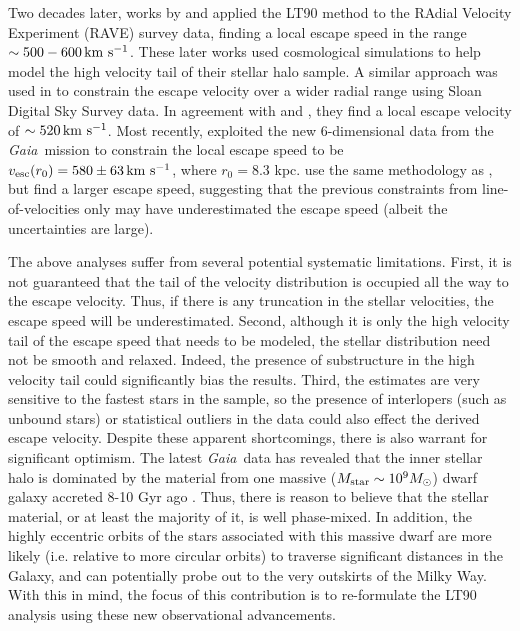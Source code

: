 \documentclass[fleqn,usenatbib]{mnras}
\newcommand{\kms}        {\,{\rm km}\,\,{\rm s}^{-1}}
\newcommand{\gaia}		{\emph{Gaia}}
\begin{document}
Two decades later, works by \cite{smith07} and \cite{piffl14} applied the LT90 method to the RAdial Velocity Experiment (RAVE) survey data, finding a local escape speed in the range $\sim 500-600 \kms$. These later works used cosmological simulations to help model the high velocity tail of their stellar halo sample. A similar approach was used in \cite{williams17} to constrain the escape velocity over a wider radial range using Sloan Digital Sky Survey data. In agreement with \cite{smith07} and \cite{piffl14}, they find a local escape velocity of $\sim 520 \kms$. Most recently, \cite{monari18} exploited the new 6-dimensional data from the \gaia\ mission \citep{gaia16, gaia18} to constrain the local escape speed to be $v_{\rm esc}(r_0) = 580 \pm 63 \kms$, where $r_0=8.3$ kpc. \cite{monari18} use the same methodology as \cite{piffl14}, but find a larger escape speed, suggesting that the previous constraints from line-of-velocities only may have underestimated the escape speed (albeit the uncertainties are large).

The above analyses suffer from several potential systematic limitations. First, it is not guaranteed that the tail of the velocity distribution is occupied all the way to the escape velocity. Thus, if there is any truncation in the stellar velocities, the escape speed will be underestimated. Second, although it is only the high velocity tail of the escape speed that needs to be modeled, the stellar distribution need not be smooth and relaxed. Indeed, the presence of substructure in the high velocity tail could significantly bias the results. Third, the estimates are very sensitive to the fastest stars in the sample, so the presence of interlopers (such as unbound stars) or statistical outliers in the data could also effect the derived escape velocity. Despite these apparent shortcomings, there is also warrant for significant optimism. The latest \gaia\ data has revealed that the inner stellar halo is dominated by the material from one massive ($M_{\rm star}\sim 10^9M_\odot$) dwarf galaxy accreted 8-10 Gyr ago \citep{belokurov18, deason18, haywood18, helmi18}. Thus, there is reason to believe that the stellar material, or at least the majority of it, is well phase-mixed. In addition, the highly eccentric orbits of the stars associated with this massive dwarf are more likely (i.e. relative to more circular orbits) to traverse significant distances in the Galaxy, and can potentially probe out to the very outskirts of the Milky Way. With this in mind, the focus of this contribution is to re-formulate the LT90 analysis using these new observational advancements.
\end{document}
